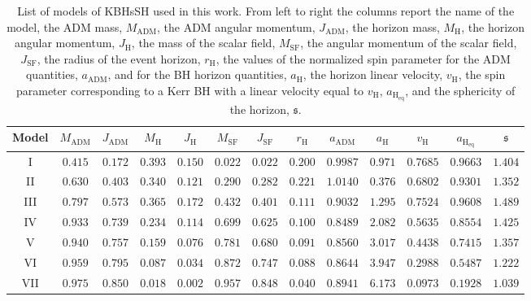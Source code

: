 \documentclass[twocolumn,aps,showpacs,showkeys,prd,superscriptaddress,byrevtex, amsmath]{revtex4-1}
\begin{document}
\begin{table}
\caption{List of models of KBHsSH used in this work. From left to right the columns report the name of the model, the ADM mass, $M_{\mathrm{ADM}}$, the ADM angular momentum, $J_{\mathrm{ADM}}$, the horizon mass, $M_{\mathrm{H}}$, the horizon angular momentum, $J_{\mathrm{H}}$, the mass of the scalar field, $M_{\mathrm{SF}}$, the angular momentum of the scalar field, $J_{\mathrm{SF}}$, the radius of the event horizon, $r_{\mathrm{H}}$, the values of the normalized spin parameter for the ADM quantities, $a_{\mathrm{ADM}}$, and for the BH horizon quantities, $a_{\mathrm{H}}$, the horizon linear velocity, $v_{\mathrm{H}}$, the spin parameter corresponding to a Kerr BH with a linear velocity equal to $v_{\mathrm{H}}$, $a_{\mathrm{H_{eq}}}$, and the sphericity of the horizon, $\mathfrak{s}$.}        
\label{models_list}      
\centering          
\begin{tabular}{c c c c  c c c c   c c c c c}
\hline\hline       
 Model & $M_{\mathrm{ADM}}$ & $J_{\mathrm{ADM}}$ & $M_{\mathrm{H}}$ &  $J_{\mathrm{H}}$ & $M_{\mathrm{SF}}$ & $J_{\mathrm{SF}}$ & $r_{\mathrm{H}}$ & $a_{\mathrm{ADM}}$ & $a_{\mathrm{H}}$ & $v_{\mathrm{H}}$ & $a_{\mathrm{H_{eq}}}$ & $\mathfrak{s}$\\ 
\hline           
I & $0.415$ & $0.172$ & $0.393$ &  $0.150$  & $0.022$ & $0.022$ & $0.200$ & $0.9987$ & $0.971$ & $0.7685$ & $0.9663$ & $1.404$\\ 
II & $0.630$ & $0.403$ & $0.340$ &  $0.121$  & $0.290$ & $0.282$ & $0.221$ & $1.0140$ & $0.376$ & $0.6802$ & $0.9301$ & $1.352$ \\
III & $0.797$ & $0.573$ & $0.365$ &  $0.172$  & $0.432$ & $0.401$ & $0.111$ & $0.9032$ & $1.295$ & $0.7524$ & $0.9608$ & $1.489$ \\ 
IV & $0.933$ & $0.739$ & $0.234$ &  $0.114$  & $0.699$ & $0.625$ & $0.100$ & $0.8489$ & $2.082$ & $0.5635$ & $0.8554$ & $1.425$ \\ 
V & $0.940$ & $0.757$ & $0.159$ &  $0.076$  & $0.781$ & $0.680$ & $0.091$ & $0.8560$ & $3.017$ & $0.4438$ & $0.7415$ & $1.357$ \\ 
VI & $0.959$ & $0.795$ & $0.087$ &  $0.034$  & $0.872$ & $0.747$ & $0.088$ & $0.8644$ & $3.947$ & $0.2988$ & $0.5487$ & $1.222$ \\ 
VII & $0.975$ & $0.850$ & $0.018$ &  $0.002$  & $0.957$ & $0.848$ & $0.040$ & $0.8941$ & $6.173$ & $0.0973$ & $0.1928$ & $1.039$ \\ 
\hline      
\end{tabular}
\end{table}
\end{document}
